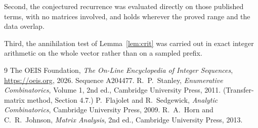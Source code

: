 \documentclass[11pt,a4paper]{article}
\theoremstyle{plain}
\theoremstyle{definition}
\begin{document}
Second, the conjectured recurrence was evaluated directly on those published terms, with no
matrices involved, and holds wherever the proved range and the data overlap.

Third, the annihilation test of Lemma~\ref{lem:crit} was carried out in exact integer
arithmetic on the whole vector rather than on a sampled prefix.

\begin{thebibliography}{9}
 The OEIS Foundation, \emph{The On-Line Encyclopedia of Integer
Sequences}, \url{https://oeis.org}, 2026. Sequence A204477.
 R.~P.~Stanley, \emph{Enumerative Combinatorics}, Volume 1, 2nd ed.,
Cambridge University Press, 2011. (Transfer-matrix method, Section 4.7.)
 P.~Flajolet and R.~Sedgewick, \emph{Analytic Combinatorics}, Cambridge
University Press, 2009.
 R.~A.~Horn and C.~R.~Johnson, \emph{Matrix Analysis}, 2nd ed., Cambridge
University Press, 2013.
\end{thebibliography}
\end{document}
